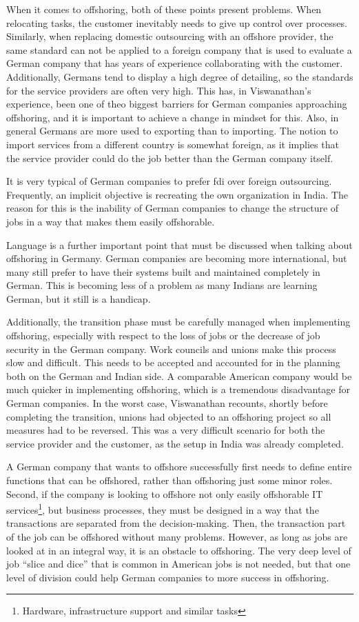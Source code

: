 When it comes to offshoring, both of these points present problems. When relocating tasks, the customer inevitably needs to give up control over processes. Similarly, when replacing domestic outsourcing with an offshore provider, the same standard can not be applied to a foreign company that is used to evaluate a German company that has years of experience collaborating with the customer. Additionally, Germans tend to display a high degree of detailing, so the standards for the service providers are often very high. This has, in Viswanathan's experience, been one of theo biggest barriers for German companies approaching offshoring, and it is important to achieve a change in mindset for this. Also, in general Germans are more used to exporting than to importing. The notion to import services from a different country is somewhat foreign, as it implies that the service provider could do the job better than the German company itself.

It is very typical of German companies to prefer \gls{fdi} over foreign outsourcing. Frequently, an implicit objective is recreating the own organization in India. The reason for this is the inability of German companies to change the structure of jobs in a way that makes them easily offshorable.

Language is a further important point that must be discussed when talking about offshoring in Germany. German companies are becoming more international, but many still prefer to have their systems built and maintained completely in German. This is becoming less of a problem as many Indians are learning German, but it still is a handicap.

Additionally, the transition phase must be carefully managed when implementing offshoring, especially with respect to the loss of jobs or the decrease of job security in the German company. Work councils and unions make this process slow and difficult. This needs to be accepted and accounted for in the planning both on the German and Indian side. A comparable American company would be much quicker in implementing offshoring, which is a tremendous disadvantage for German companies. In the worst case, Viswanathan recounts, shortly before completing the transition, unions had objected to an offshoring project so all measures had to be reversed. This was a very difficult scenario for both the service provider and the customer, as the setup in India was already completed.

A German company that wants to offshore successfully first needs to define entire functions that can be offshored, rather than offshoring just some minor roles. Second, if the company is looking to offshore not only easily offshorable IT services\footnote{Hardware, infrastructure support and similar tasks}, but business processes, they must be designed in a way that the transactions are separated from the decision-making. Then, the transaction part of the job can be offshored without many problems. However, as long as jobs are looked at in an integral way, it is an obstacle to offshoring. The very deep level of job ``slice and dice'' that is common in American jobs is not needed, but that one level of division could help German companies to more success in offshoring.

